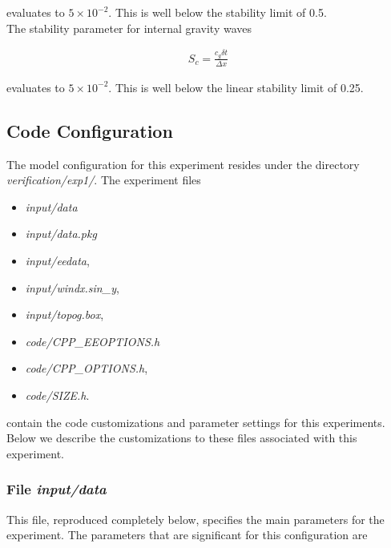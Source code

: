 \noindent evaluates to $5 \times 10^{-2}$. This is well below the stability 
limit of 0.5.
\\

\noindent The stability parameter for internal gravity waves 
\cite{adcroft:95}

\begin{eqnarray}
\label{EQ:cfl_stability}
S_{c} = \frac{c_{g} \delta t}{ \Delta x}
\end{eqnarray}

\noindent evaluates to $5 \times 10^{-2}$. This is well below the linear
stability limit of 0.25.
  
\subsection{Code Configuration}
\label{SEC:code_config}

The model configuration for this experiment resides under the 
directory {\it verification/exp1/}.  The experiment files 
\begin{itemize}
\item {\it input/data}
\item {\it input/data.pkg}
\item {\it input/eedata},
\item {\it input/windx.sin\_y},
\item {\it input/topog.box},
\item {\it code/CPP\_EEOPTIONS.h}
\item {\it code/CPP\_OPTIONS.h},
\item {\it code/SIZE.h}. 
\end{itemize}
contain the code customizations and parameter settings for this 
experiments. Below we describe the customizations
to these files associated with this experiment.

\subsubsection{File {\it input/data}}

This file, reproduced completely below, specifies the main parameters 
for the experiment. The parameters that are significant for this configuration
are

